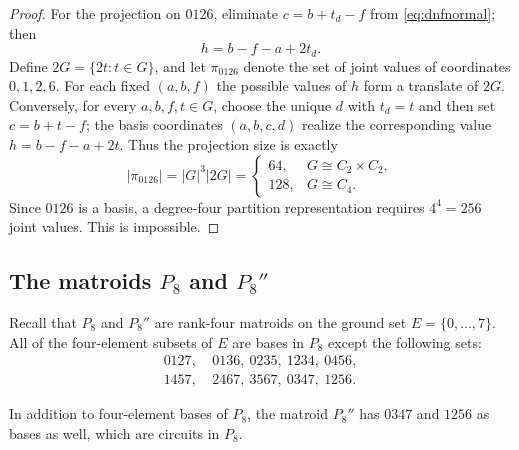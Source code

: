 \documentclass[preprint,12pt]{elsarticle}
\theoremstyle{definition}
\begin{document}
\begin{proof}
For the projection on $0126$, eliminate $c=b+t_d-f$ from \eqref{eq:dnfnormal}; then
\[
h=b-f-a+2t_d.
\]
Define $2G=\{2t:t\in G\}$, and let $\pi_{0126}$ denote the set of joint values of coordinates $0,1,2,6$. For each fixed $(a,b,f)$ the possible values of $h$ form a translate of $2G$. Conversely, for every $a,b,f,t\in G$, choose the unique $d$ with $t_d=t$ and then set $c=b+t-f$; the basis coordinates $(a,b,c,d)$ realize the corresponding value $h=b-f-a+2t$. Thus the projection size is exactly
\[
|\pi_{0126}|=|G|^3|2G|=
\begin{cases}
64,&G\cong C_2\times C_2,\\
128,&G\cong C_4.
\end{cases}
\]
Since $0126$ is a basis, a degree-four partition representation requires $4^4=256$ joint values. This is impossible.
\end{proof}

\subsection{The matroids \texorpdfstring{$P_8$ and $P_8''$}{P8 and P8 double-prime}}\label{sec:p8}

Recall that $P_8$ and $P_8''$ are rank-four matroids on the ground set
$E = \{0,\dots,7\}$. All of the four-element subsets of $E$ are bases in $P_8$
except the following sets:
\begin{equation}\label{eq: p8 restated}
	\begin{split}
		0127,&\ 0136,\ 0235,\ 1234,\ 0456,\\
		1457,&\ 2467,\ 3567,\ 0347,\ 1256.
	\end{split}
\end{equation}

In addition to four-element bases of $P_8$, the matroid $P_8''$ has $0347$ and $1256$ as bases as well, which are circuits in $P_8$.
\end{document}
